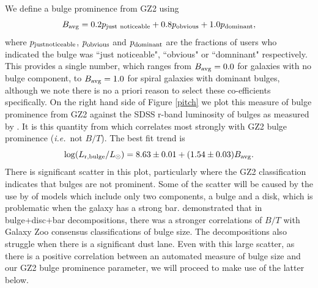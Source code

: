 \documentclass[usenatbib]{mn2e}
\newcommand{\ie}{{\it i.e.}}
\newcommand{\be}{\begin{equation}}
\newcommand{\ee}{\end{equation}}
\begin{document}
We define a bulge prominence from GZ2 using
\be
\label{eqn:bulge}
B_{\rm avg} = 0.2p_{\rm  just~noticeable} + 0.8p_{\rm obvious}+ 1.0p_{\rm dominant},
\ee
where $p_{\rm  just noticeable}$, $p_{\rm obvious}$ and $p_{\rm dominant}$ are the fractions of users who indicated the bulge was ``just noticeable", ``obvious" or ``domninant" respectively. This provides a single number, which ranges from $B_{\rm avg} = 0.0$ for galaxies with no bulge component, to $B_{\rm avg} = 1.0$ for spiral galaxies with dominant bulges, although we note there is no a priori reason to select these co-efficients specifically. On the right hand side of Figure \ref{pitch} we plot this measure of bulge prominence from GZ2 against the SDSS r-band luminosity of bulges as measured by \citet{Simard2011}. It is this quantity from \citet{Simard2011} which correlates most strongly with GZ2 bulge prominence (\ie ~not $B/T$).  The best fit trend is 
\be 
\log(L_{\rm r,bulge}/L_\odot) = 8.63\pm0.01 + (1.54\pm0.03) B_{\rm avg}.
\ee
There is significant scatter in this plot, particularly where the GZ2 classification indicates that bulges are not prominent. Some of the scatter will be caused by the use by \citet{Simard2011} of models which include only two components, a bulge and a disk, which is problematic when the galaxy has a strong bar. \citet{Kruk2018} demonstrated that in bulge+disc+bar decompositions, there was a stronger correlations of $B/T$ with Galaxy Zoo consensus classifications of bulge size. The \citet{Simard2011} decompositions also struggle when there is a significant dust lane. Even with this large scatter, as there is a positive correlation between an automated measure of bulge size and our GZ2 bulge prominence parameter, we will proceed to make use of the latter below. 
 
\end{document}
